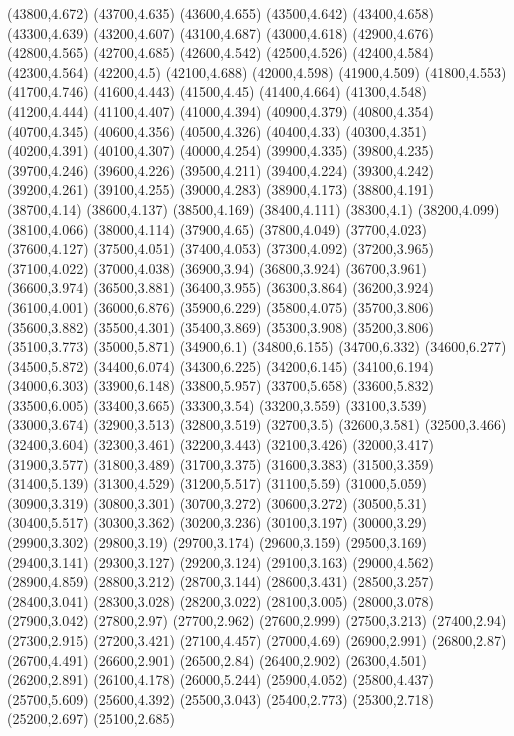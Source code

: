 (43800,4.672)
(43700,4.635)
(43600,4.655)
(43500,4.642)
(43400,4.658)
(43300,4.639)
(43200,4.607)
(43100,4.687)
(43000,4.618)
(42900,4.676)
(42800,4.565)
(42700,4.685)
(42600,4.542)
(42500,4.526)
(42400,4.584)
(42300,4.564)
(42200,4.5)
(42100,4.688)
(42000,4.598)
(41900,4.509)
(41800,4.553)
(41700,4.746)
(41600,4.443)
(41500,4.45)
(41400,4.664)
(41300,4.548)
(41200,4.444)
(41100,4.407)
(41000,4.394)
(40900,4.379)
(40800,4.354)
(40700,4.345)
(40600,4.356)
(40500,4.326)
(40400,4.33)
(40300,4.351)
(40200,4.391)
(40100,4.307)
(40000,4.254)
(39900,4.335)
(39800,4.235)
(39700,4.246)
(39600,4.226)
(39500,4.211)
(39400,4.224)
(39300,4.242)
(39200,4.261)
(39100,4.255)
(39000,4.283)
(38900,4.173)
(38800,4.191)
(38700,4.14)
(38600,4.137)
(38500,4.169)
(38400,4.111)
(38300,4.1)
(38200,4.099)
(38100,4.066)
(38000,4.114)
(37900,4.65)
(37800,4.049)
(37700,4.023)
(37600,4.127)
(37500,4.051)
(37400,4.053)
(37300,4.092)
(37200,3.965)
(37100,4.022)
(37000,4.038)
(36900,3.94)
(36800,3.924)
(36700,3.961)
(36600,3.974)
(36500,3.881)
(36400,3.955)
(36300,3.864)
(36200,3.924)
(36100,4.001)
(36000,6.876)
(35900,6.229)
(35800,4.075)
(35700,3.806)
(35600,3.882)
(35500,4.301)
(35400,3.869)
(35300,3.908)
(35200,3.806)
(35100,3.773)
(35000,5.871)
(34900,6.1)
(34800,6.155)
(34700,6.332)
(34600,6.277)
(34500,5.872)
(34400,6.074)
(34300,6.225)
(34200,6.145)
(34100,6.194)
(34000,6.303)
(33900,6.148)
(33800,5.957)
(33700,5.658)
(33600,5.832)
(33500,6.005)
(33400,3.665)
(33300,3.54)
(33200,3.559)
(33100,3.539)
(33000,3.674)
(32900,3.513)
(32800,3.519)
(32700,3.5)
(32600,3.581)
(32500,3.466)
(32400,3.604)
(32300,3.461)
(32200,3.443)
(32100,3.426)
(32000,3.417)
(31900,3.577)
(31800,3.489)
(31700,3.375)
(31600,3.383)
(31500,3.359)
(31400,5.139)
(31300,4.529)
(31200,5.517)
(31100,5.59)
(31000,5.059)
(30900,3.319)
(30800,3.301)
(30700,3.272)
(30600,3.272)
(30500,5.31)
(30400,5.517)
(30300,3.362)
(30200,3.236)
(30100,3.197)
(30000,3.29)
(29900,3.302)
(29800,3.19)
(29700,3.174)
(29600,3.159)
(29500,3.169)
(29400,3.141)
(29300,3.127)
(29200,3.124)
(29100,3.163)
(29000,4.562)
(28900,4.859)
(28800,3.212)
(28700,3.144)
(28600,3.431)
(28500,3.257)
(28400,3.041)
(28300,3.028)
(28200,3.022)
(28100,3.005)
(28000,3.078)
(27900,3.042)
(27800,2.97)
(27700,2.962)
(27600,2.999)
(27500,3.213)
(27400,2.94)
(27300,2.915)
(27200,3.421)
(27100,4.457)
(27000,4.69)
(26900,2.991)
(26800,2.87)
(26700,4.491)
(26600,2.901)
(26500,2.84)
(26400,2.902)
(26300,4.501)
(26200,2.891)
(26100,4.178)
(26000,5.244)
(25900,4.052)
(25800,4.437)
(25700,5.609)
(25600,4.392)
(25500,3.043)
(25400,2.773)
(25300,2.718)
(25200,2.697)
(25100,2.685)
